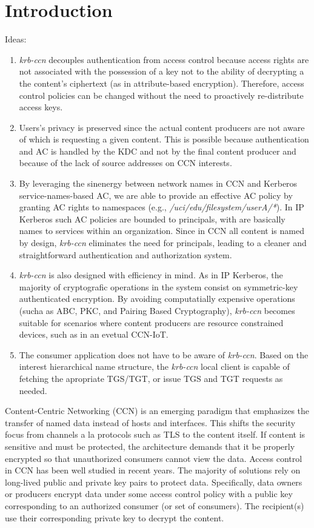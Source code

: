 \section{Introduction}

\nocite{adams1995hitchhiker}

Ideas:
\begin{enumerate}
  \item \emph{krb-ccn} decouples authentication from access control because access rights
	are not associated with the possession of a key not to the ability of decrypting a
	the content's ciphertext (as in attribute-based encryption). Therefore, access control
	policies can be changed without the need to proactively re-distribute access keys.
  \item Users's privacy is preserved since the actual content producers are not aware of which
	is requesting a given content. This is possible because authentication and AC is handled
	by the KDC and not by the final content producer and because of the lack of source addresses
	on CCN interests.
  \item By leveraging the sinenergy between network names in CCN and Kerberos service-names-based AC, we are
	able to provide an effective AC policy by granting AC rights to namespaces (e.g., \emph{/uci/edu/filesystem/userA/*}).
	In IP Kerberos such AC policies are bounded to principals, with are basically names to services within an organization.
	Since in CCN all content is named by design, \emph{krb-ccn} eliminates the need for principals, leading to a cleaner and
	straightforward authentication and authorization system.
  \item \emph{krb-ccn} is also designed with efficiency in mind. As in IP Kerberos, the majority of cryptografic operations in the
	system consist on symmetric-key authenticated encryption. By avoiding computatially expensive operations (sucha as ABC, PKC, and Pairing Based Cryptography),
	\emph{krb-ccn} becomes suitable for scenarios where content producers are resource constrained devices, such as in an evetual CCN-IoT.
  \item The consumer application does not have to be aware of \emph{krb-ccn}. Based on the interest hierarchical name structure,
	the \emph{krb-ccn} local client is capable of fetching the apropriate TGS/TGT, or issue TGS and TGT requests as needed.
\end{enumerate}


Content-Centric Networking (CCN) is an emerging paradigm that emphasizes the transfer
of named data instead of hosts and interfaces. This shifts the security focus from
channels a la protocols such as TLS to the content itself. If content is sensitive
and must be protected, the architecture demands that it be properly encrypted so
that unauthorized consumers cannot view the data. Access control in CCN has been
well studied in recent years. The majority of solutions rely on long-lived public
and private key pairs to protect data. Specifically, data owners or producers
encrypt data under some access control policy with a public key corresponding to
an authorized consumer (or set of consumers). The recipient(s) use their
corresponding private key to decrypt the content.

